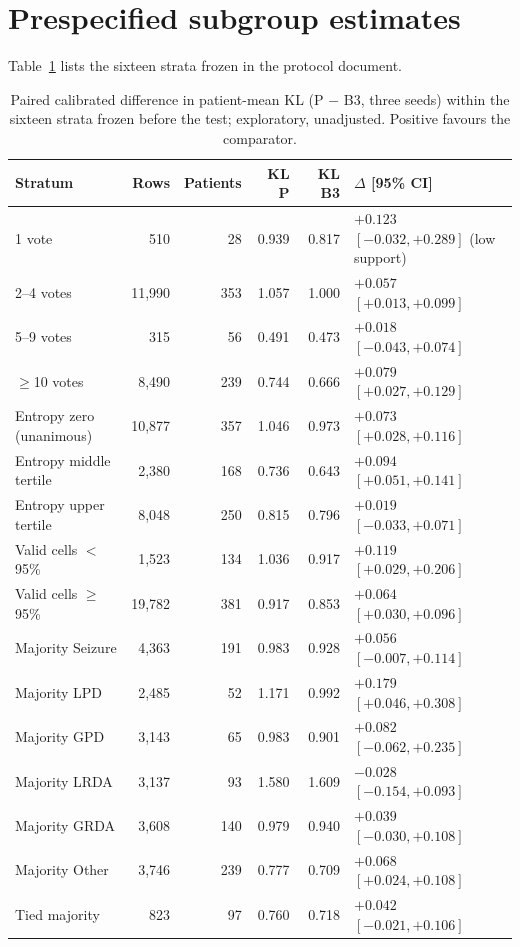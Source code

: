 \documentclass[manuscript,anonymous,nonacm]{acmart}
\begin{document}
\section{Prespecified subgroup estimates}
Table~\ref{tab:supstrata} lists the sixteen strata frozen in the protocol document.
\begin{table}[htbp]
\caption{Paired calibrated difference in patient-mean KL (P $-$ B3, three seeds) within the sixteen strata frozen before the test; exploratory, unadjusted. Positive favours the comparator.}
\label{tab:supstrata}
\small\setlength{\tabcolsep}{6pt}
\begin{tabular}{lrrrrl}
\toprule
Stratum & Rows & Patients & KL P & KL B3 & $\Delta$ [95\% CI] \\
\midrule
1 vote & 510 & 28 & 0.939 & 0.817 & $+0.123$ $[-0.032,+0.289]$ (low support) \\
2--4 votes & 11,990 & 353 & 1.057 & 1.000 & $+0.057$ $[+0.013,+0.099]$ \\
5--9 votes & 315 & 56 & 0.491 & 0.473 & $+0.018$ $[-0.043,+0.074]$ \\
$\ge$10 votes & 8,490 & 239 & 0.744 & 0.666 & $+0.079$ $[+0.027,+0.129]$ \\
Entropy zero (unanimous) & 10,877 & 357 & 1.046 & 0.973 & $+0.073$ $[+0.028,+0.116]$ \\
Entropy middle tertile & 2,380 & 168 & 0.736 & 0.643 & $+0.094$ $[+0.051,+0.141]$ \\
Entropy upper tertile & 8,048 & 250 & 0.815 & 0.796 & $+0.019$ $[-0.033,+0.071]$ \\
Valid cells $<$ 95\% & 1,523 & 134 & 1.036 & 0.917 & $+0.119$ $[+0.029,+0.206]$ \\
Valid cells $\ge$ 95\% & 19,782 & 381 & 0.917 & 0.853 & $+0.064$ $[+0.030,+0.096]$ \\
Majority Seizure & 4,363 & 191 & 0.983 & 0.928 & $+0.056$ $[-0.007,+0.114]$ \\
Majority LPD & 2,485 & 52 & 1.171 & 0.992 & $+0.179$ $[+0.046,+0.308]$ \\
Majority GPD & 3,143 & 65 & 0.983 & 0.901 & $+0.082$ $[-0.062,+0.235]$ \\
Majority LRDA & 3,137 & 93 & 1.580 & 1.609 & $-0.028$ $[-0.154,+0.093]$ \\
Majority GRDA & 3,608 & 140 & 0.979 & 0.940 & $+0.039$ $[-0.030,+0.108]$ \\
Majority Other & 3,746 & 239 & 0.777 & 0.709 & $+0.068$ $[+0.024,+0.108]$ \\
Tied majority & 823 & 97 & 0.760 & 0.718 & $+0.042$ $[-0.021,+0.106]$ \\
\bottomrule
\end{tabular}
\end{table}
\end{document}
